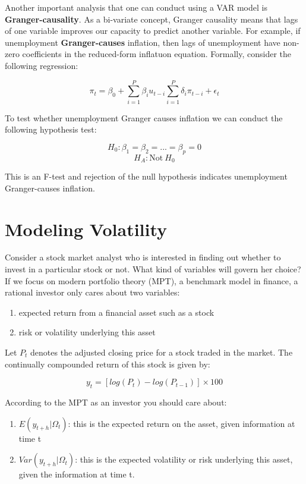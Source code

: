 \documentclass[]{book}
\providecommand{\tightlist}{%
  \setlength{\itemsep}{0pt}\setlength{\parskip}{0pt}}
\theoremstyle{definition}
\theoremstyle{definition}
\theoremstyle{definition}
\theoremstyle{remark}
\begin{document}
Another important analysis that one can conduct using a VAR model is \textbf{Granger-causality}. As a bi-variate concept, Granger causality means that lags of one variable improves our capacity to predict another variable. For example, if unemployment \textbf{Granger-causes} inflation, then lags of unemployment have non-zero coefficients in the reduced-form inflatuon equation. Formally, consider the following regression:

\[\pi_t=\beta_0 + \sum_{i=1}^{P} \beta_i u_{t-i} \sum_{i=1}^{P} \delta_i \pi_{t-i} + \epsilon_t\]

To test whether unemployment Granger causes inflation we can conduct the following hypothesis test:

\[H_0: \beta_1=\beta_2=...=\beta_p=0\]
\[H_A: \text{Not} \ H_0\]

This is an F-test and rejection of the null hypothesis indicates unemployment Granger-causes inflation.

\hypertarget{modeling-volatility}{%
\chapter{Modeling Volatility}\label{modeling-volatility}}

Consider a stock market analyst who is interested in finding out whether to invest in a particular stock or not. What kind of variables will govern her choice? If we focus on modern portfolio theory (MPT), a benchmark model in finance, a rational investor only cares about two variables:

\begin{enumerate}
\def\labelenumi{\arabic{enumi}.}
\tightlist
\item
  expected return from a financial asset such as a stock
\item
  risk or volatility underlying this asset
\end{enumerate}

Let \(P_t\) denotes the adjusted closing price for a stock traded in the market. The continually compounded return of this stock is given by:

\[y_t=[log(P_t)-log(P_{t-1})]\times 100\]

According to the MPT as an investor you should care about:

\begin{enumerate}
\def\labelenumi{\arabic{enumi}.}
\tightlist
\item
  \(E(y_{t+h}|\Omega_t)\): this is the expected return on the asset, given information at time t
\item
  \(Var(y_{t+h}|\Omega_t)\): this is the expected volatility or risk underlying this asset, given the information at time t.
\end{enumerate}
\end{document}
